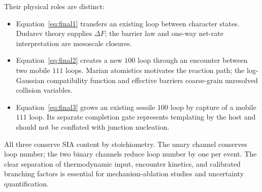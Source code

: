 \documentclass[11pt,a4paper]{article}
\begin{document}
Their physical roles are distinct:
\begin{itemize}
\item Equation~\eqref{eq:final1} transfers an existing loop between character
states.  Dudarev theory supplies $\Delta F$; the barrier law and one-way net-rate
interpretation are mesoscale closures.
\item Equation~\eqref{eq:final2} creates a new $100$ loop through an encounter
between two mobile $111$ loops.  Marian atomistics motivates the reaction path;
the log-Gaussian compatibility function and effective barriers coarse-grain
unresolved collision variables.
\item Equation~\eqref{eq:final3} grows an existing sessile $100$ loop by capture
of a mobile $111$ loop.  Its separate completion gate represents templating by
the host and should not be conflated with junction nucleation.
\end{itemize}
All three conserve SIA content by stoichiometry.  The unary channel conserves
loop number; the two binary channels reduce loop number by one per event.  The
clear separation of thermodynamic input, encounter kinetics, and calibrated
branching factors is essential for mechanism-ablation studies and uncertainty
quantification.
\end{document}

